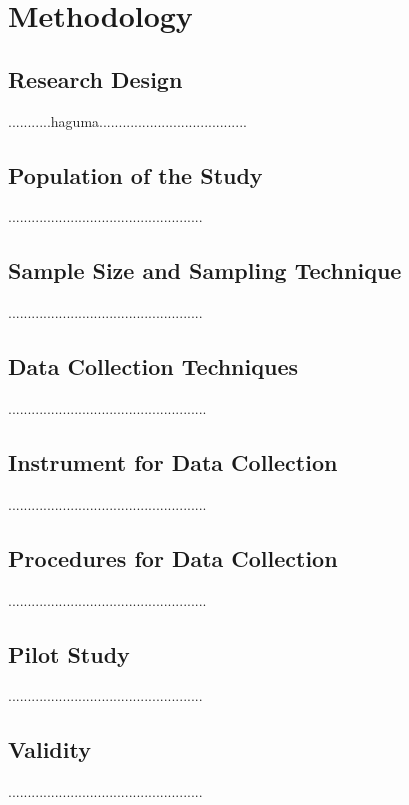 
\section{Methodology} %

\label{Chapter1} %





\subsection{Research Design}
...........haguma\cite{David}......................................
\subsection{Population of the Study}
..................................................
\subsection{Sample Size and Sampling Technique}
..................................................
\subsection{Data Collection Techniques}
...................................................
\subsection{Instrument for Data Collection}
...................................................
\subsection{Procedures for Data Collection}
...................................................
\subsection{Pilot Study}
..................................................
\subsection{Validity}
..................................................
